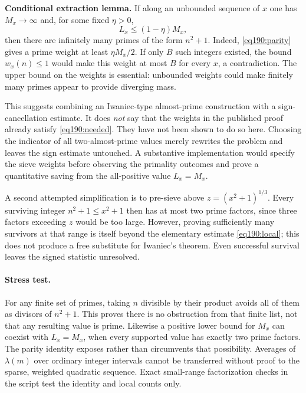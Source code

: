 \documentclass[11pt,a4paper]{article}
\numberwithin{equation}{section}
\begin{document}
\textbf{Conditional extraction lemma.} If along an unbounded sequence of $x$ one has $M_x\to\infty$ and, for some fixed $\eta>0$,
\begin{equation}\label{eq190:needed}
 L_x\le(1-\eta)M_x,
\end{equation}
then there are infinitely many primes of the form $n^2+1$.
Indeed, \eqref{eq190:parity} gives a prime weight at least $\eta M_x/2$. If only $B$ such integers existed, the bound $w_x(n)\le1$ would make this weight at most $B$ for every $x$, a contradiction. The upper bound on the weights is essential: unbounded weights could make finitely many primes appear to provide diverging mass.

This suggests combining an Iwaniec-type almost-prime construction with a sign-cancellation estimate. It does \emph{not} say that the weights in the published proof already satisfy \eqref{eq190:needed}. They have not been shown to do so here. Choosing the indicator of all two-almost-prime values merely rewrites the problem and leaves the sign estimate untouched. A substantive implementation would specify the sieve weights before observing the primality outcomes and prove a quantitative saving from the all-positive value $L_x=M_x$.

A second attempted simplification is to pre-sieve above $z=(x^2+1)^{1/3}$. Every surviving integer $n^2+1\le x^2+1$ then has at most two prime factors, since three factors exceeding $z$ would be too large. However, proving sufficiently many survivors at that range is itself beyond the elementary estimate \eqref{eq190:local}; this does not produce a free substitute for Iwaniec's theorem. Even successful survival leaves the signed statistic unresolved.

\paragraph{Stress test.}
For any finite set of primes, taking $n$ divisible by their product avoids all of them as divisors of $n^2+1$. This proves there is no obstruction from that finite list, not that any resulting value is prime. Likewise a positive lower bound for $M_x$ can coexist with $L_x=M_x$, when every supported value has exactly two prime factors. The parity identity exposes rather than circumvents that possibility. Averages of $\lambda(m)$ over ordinary integer intervals cannot be transferred without proof to the sparse, weighted quadratic sequence. Exact small-range factorization checks in the script test the identity and local counts only.
\end{document}
